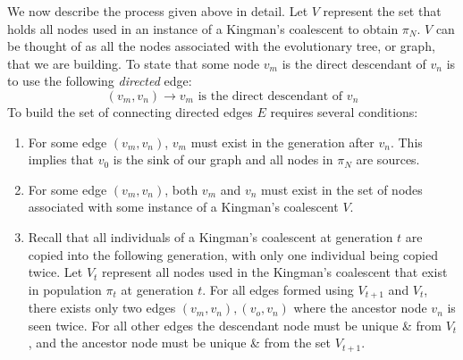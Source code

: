 We now describe the process given above in detail.
%
Let $V$ represent the set that holds all nodes used in an instance of a Kingman's coalescent to obtain $\pi_N$.
$V$ can be thought of as all the nodes associated with the evolutionary tree, or graph, that we are building.
To state that some node $v_m$ is the direct descendant of $v_n$ is to use the following \emph{directed} edge:
\begin{equation}
    (v_m, v_n) \rightarrow v_m \text{ is the direct descendant of } v_n
\end{equation}
To build the set of connecting directed edges $E$ requires several conditions:
\begin{enumerate}
    \item For some edge $(v_m, v_n)$, $v_m$ must exist in the generation after $v_n$.
        This implies that $v_0$ is the sink of our graph and all nodes in $\pi_N$ are sources.
    \item For some edge $(v_m, v_n)$, both $v_m$ and $v_n$ must exist in the set of nodes associated with some instance
        of a Kingman's coalescent $V$.
    \item Recall that all individuals of a Kingman's coalescent at generation $t$ are copied into the following
        generation, with only one individual being copied twice.
        Let $V_t$ represent all nodes used in the Kingman's coalescent that exist in population $\pi_t$ at generation
        $t$.
        For all edges formed using $V_{t+1}$ and $V_{t}$, there exists only two edges $(v_m, v_n), (v_o, v_n)$ where
        the ancestor node $v_n$ is seen twice.
        For all other edges the descendant node must be unique \& from $V_t$, and the ancestor node must be unique \&
        from the set $V_{t+1}$.
\end{enumerate}

